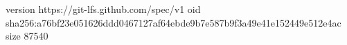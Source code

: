 version https://git-lfs.github.com/spec/v1
oid sha256:a76bf23e051626ddd0467127af64ebde9b7e587b9f3a49e41e152449e512e4ac
size 87540
